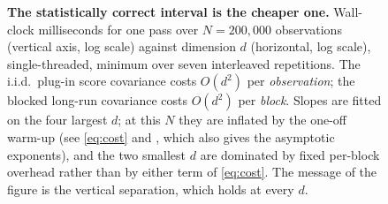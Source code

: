 \begin{figure}[tbp]
\centering
\begin{minipage}[t]{0.485\linewidth}
\centering
{}
\caption{\textbf{At matched cost, a deterministic gap decorrelates curvature updates
exponentially in $m$ while random thinning only does so linearly} ().
Vertical axis: $n\,\E\lVert\Hb-H\rVert_F^2$ divided by its exact independent-data value
$(\tr\Sigma)^2+\lVert\Sigma\rVert_F^2$ --- a computed constant, not a fitted normalisation.
Pale bands are the two predictions; markers are measurements with the optimisation frozen at
$\ts$, so only estimation quality is compared. $\kappa_H=(1+\phi^2)/(1-\phi^2)$ here.}
\label{fig:gap}
\end{minipage}\hfill
\begin{minipage}[t]{0.485\linewidth}
\centering
{}
\caption{\textbf{The statistically correct interval is the cheaper one.} Wall-clock
milliseconds for one pass over $N=200{,}000$ observations (vertical axis, log scale) against
dimension $d$ (horizontal, log scale), single-threaded, minimum over seven interleaved
repetitions. The i.i.d.\ plug-in score covariance costs $O(d^2)$ per \emph{observation}; the
blocked long-run covariance costs $O(d^2)$ per \emph{block}. Slopes are fitted on the four
largest $d$; at this $N$ they are inflated by the one-off warm-up (see \eqref{eq:cost} and
, which also gives the asymptotic exponents), and the two smallest $d$ are
dominated by fixed per-block overhead rather than by either term of \eqref{eq:cost}. The
message of the figure is the vertical separation, which holds at every $d$.}
\label{fig:cost}
\end{minipage}
\end{figure}
